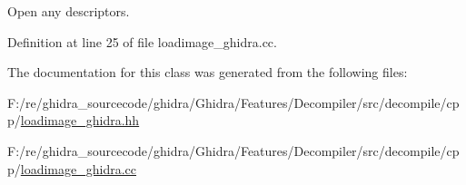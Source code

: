 Open any descriptors. 



Definition at line 25 of file loadimage\+\_\+ghidra.\+cc.



The documentation for this class was generated from the following files\+:\begin{DoxyCompactItemize}
\item 
F\+:/re/ghidra\+\_\+sourcecode/ghidra/\+Ghidra/\+Features/\+Decompiler/src/decompile/cpp/\mbox{\hyperlink{loadimage__ghidra_8hh}{loadimage\+\_\+ghidra.\+hh}}\item 
F\+:/re/ghidra\+\_\+sourcecode/ghidra/\+Ghidra/\+Features/\+Decompiler/src/decompile/cpp/\mbox{\hyperlink{loadimage__ghidra_8cc}{loadimage\+\_\+ghidra.\+cc}}\end{DoxyCompactItemize}
